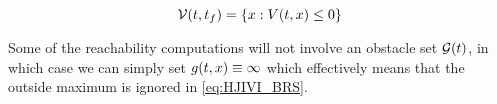 \begin{equation}
\label{eq:implicitValfuncs}
\brs(t, t_f) = \{\state: \valfunc(t, \state) \le 0\}
\end{equation}

Some of the reachability computations will not involve an obstacle set $\mathcal{G}(t)$, in which case we can simply set $g(t, x) \equiv \infty$ which effectively means that the outside maximum is ignored in \eqref{eq:HJIVI_BRS}. %

%

